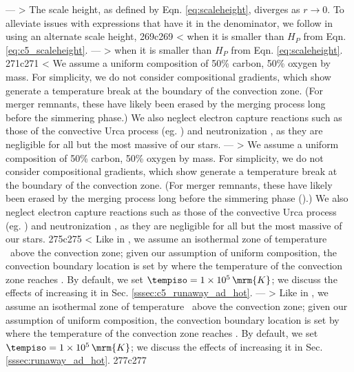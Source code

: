 ---
> The scale height, as defined by Eqn. \ref{eq:scaleheight}, diverges as $r\rightarrow0$.  To alleviate issues with expressions that have it in the denominator, we follow \cite{paxt+11} in using an alternate scale height,
269c269
< \noindent when it is smaller than $H_P$ from Eqn. \ref{eq:c5_scaleheight}.
---
> \noindent when it is smaller than $H_P$ from Eqn. \ref{eq:scaleheight}.
271c271
< We assume a uniform composition of 50\% carbon, 50\% oxygen by mass.  For simplicity, we do not consider compositional gradients, which \citeal{piroc08} show generate a temperature break at the boundary of the convection zone.  (For merger remnants, these have likely been erased by the merging process long before the simmering phase.)  We also neglect electron capture reactions such as those of the convective Urca process (eg. \citealt{steiw06}) and neutronization \citep{pirob08}, as they are negligible for all but the most massive of our stars.  
---
> We assume a uniform composition of 50\% carbon, 50\% oxygen by mass.  For simplicity, we do not consider compositional gradients, which \citeal{piroc08} show generate a temperature break at the boundary of the convection zone.  (For merger remnants, these have likely been erased by the merging process long before the simmering phase (\citeal{zhu+13}).)  We also neglect electron capture reactions such as those of the convective Urca process (eg. \citealt{steiw06}) and neutronization \citep{pirob08}, as they are negligible for all but the most massive of our stars.  
275c275
< Like in \citeal{piroc08}, we assume an isothermal zone of temperature \tempiso\ above the convection zone; given our assumption of uniform composition, the convection boundary location is set by where the temperature of the convection zone reaches \tempiso.  By default, we set $\tempiso = 1\times10^5\,\mrm{K}$; we discuss the effects of increasing it in Sec. \ref{sssec:c5_runaway_ad_hot}.
---
> Like in \citeal{piroc08}, we assume an isothermal zone of temperature \tempiso\ above the convection zone; given our assumption of uniform composition, the convection boundary location is set by where the temperature of the convection zone reaches \tempiso.  By default, we set $\tempiso = 1\times10^5\,\mrm{K}$; we discuss the effects of increasing it in Sec. \ref{sssec:runaway_ad_hot}.
277c277
